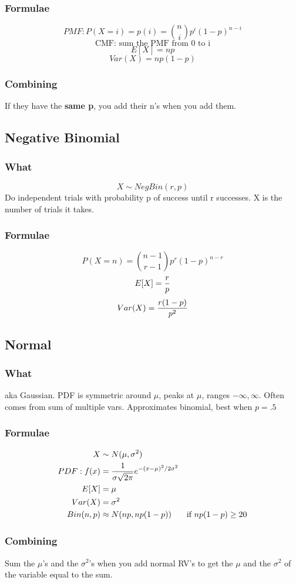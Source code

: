 \documentclass[12pt]{amsart}
\begin{document}
\subsubsection{Formulae}
\[
PMF: P(X = i) = p(i) = {n \choose i} p^i (1-p)^{n-i}
\]
\[
\text{CMF: sum the PMF from 0 to i}
\]
\[
E[X] = np
\]
\[
Var(X) = np(1-p)
\]
\subsubsection{Combining}
If they have the \textbf{same p}, you add their n's when you add them.
%
\subsection{Negative Binomial}
\subsubsection{What}
\[
X \sim NegBin(r, p)
\]
Do independent trials with probability p of success until r successes. X is the number of trials it takes.
\subsubsection{Formulae}
\[
P(X = n) = {n - 1 \choose r - 1} p^r (1-p)^{n-r}
\]
\[
E[X] = {r \over p}
\]
\[
Var(X) = {r(1-p) \over p^2}
\]
%
\subsection{Normal}
\subsubsection{What}
aka Gaussian. PDF is symmetric around $\mu$, peaks at $\mu$, ranges $-\infty, \infty$. Often comes from sum of multiple vars. Approximates binomial, best when $p = .5$
\subsubsection{Formulae}
\begin{align*}
X &\sim N(\mu, \sigma^2) \\
PDF: f(x) &= {1 \over \sigma \sqrt{2\pi}} e^{-(x-\mu)^2 / 2 \sigma^2} \\
E[X] &= \mu \\
Var(X) &= \sigma^2 \\
Bin(n, p) &\approx N(np, np(1-p)) & \text{if } np(1-p) \geq 20
\end{align*}
\subsubsection{Combining}
Sum the $\mu$'s and the $\sigma^2$'s when you add normal RV's to get the $\mu$ and the $\sigma^2$ of the variable equal to the sum.
%
\end{document}
